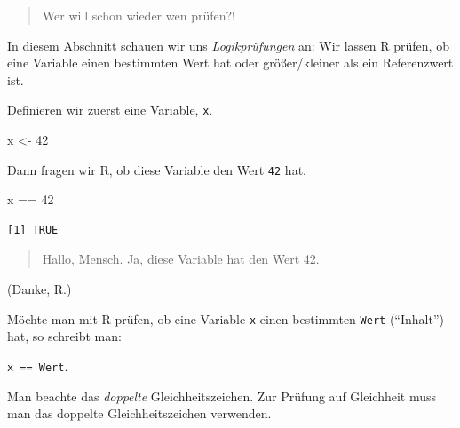 \documentclass[
  letterpaper,
  DIV=11,
  numbers=noendperiod]{scrartcl}
\newenvironment{Shaded}{\begin{snugshade}}{\end{snugshade}}
\newcommand{\DecValTok}[1]{\textcolor[rgb]{0.68,0.00,0.00}{#1}}
\newcommand{\NormalTok}[1]{\textcolor[rgb]{0.00,0.23,0.31}{#1}}
\newcommand{\OtherTok}[1]{\textcolor[rgb]{0.00,0.23,0.31}{#1}}
\newcommand{\SpecialCharTok}[1]{\textcolor[rgb]{0.37,0.37,0.37}{#1}}
\theoremstyle{definition}
\theoremstyle{definition}
\theoremstyle{definition}
\theoremstyle{remark}
\begin{document}
\begin{quote}
Wer will schon wieder wen prüfen?!
\end{quote}

In diesem Abschnitt schauen wir uns \emph{Logikprüfungen} an: Wir lassen
R prüfen, ob eine Variable einen bestimmten Wert hat oder größer/kleiner
als ein Referenzwert ist.

Definieren wir zuerst eine Variable, \texttt{x}.

\begin{Shaded}
\begin{Highlighting}[]
\NormalTok{x }\OtherTok{\textless{}{-}} \DecValTok{42}
\end{Highlighting}
\end{Shaded}

Dann fragen wir R, ob diese Variable den Wert \texttt{42} hat.

\begin{Shaded}
\begin{Highlighting}[]
\NormalTok{x }\SpecialCharTok{==} \DecValTok{42}
\end{Highlighting}
\end{Shaded}

\begin{verbatim}
[1] TRUE
\end{verbatim}

\begin{quote}
Hallo, Mensch. Ja, diese Variable hat den Wert 42.
\end{quote}

(Danke, R.)

Möchte man mit R prüfen, ob eine Variable \texttt{x} einen bestimmten
\texttt{Wert} (``Inhalt'') hat, so schreibt man:

\texttt{x\ ==\ Wert}.

\begin{tcolorbox}[enhanced jigsaw, coltitle=black, colframe=quarto-callout-important-color-frame, opacityback=0, toprule=.15mm, opacitybacktitle=0.6, arc=.35mm, titlerule=0mm, toptitle=1mm, title=\textcolor{quarto-callout-important-color}{\faExclamation}\hspace{0.5em}{Important}, bottomtitle=1mm, leftrule=.75mm, breakable, rightrule=.15mm, colbacktitle=quarto-callout-important-color!10!white, bottomrule=.15mm, colback=white, left=2mm]

Man beachte das \emph{doppelte} Gleichheitszeichen. Zur Prüfung auf
Gleichheit muss man das doppelte Gleichheitszeichen verwenden.

\end{tcolorbox}
\end{document}
